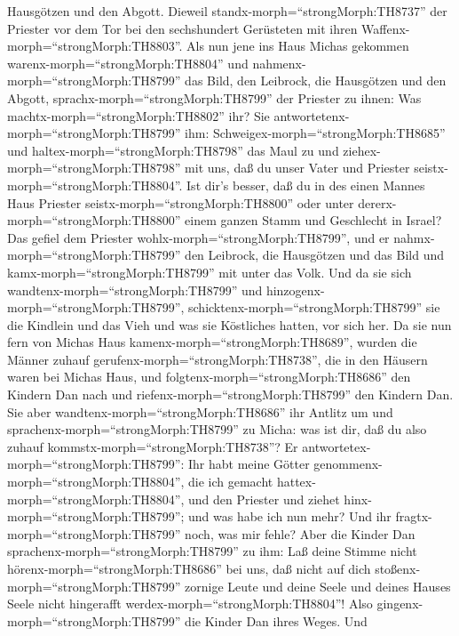 Hausgötzen und den Abgott. Dieweil standx-morph=``strongMorph:TH8737''
der Priester vor dem Tor bei den sechshundert Gerüsteten mit ihren
Waffenx-morph=``strongMorph:TH8803''.  Als nun jene ins
Haus Michas gekommen warenx-morph=``strongMorph:TH8804'' und
nahmenx-morph=``strongMorph:TH8799'' das Bild, den Leibrock, die
Hausgötzen und den Abgott, sprachx-morph=``strongMorph:TH8799'' der
Priester zu ihnen: Was machtx-morph=``strongMorph:TH8802'' ihr?
 Sie antwortetenx-morph=``strongMorph:TH8799'' ihm:
Schweigex-morph=``strongMorph:TH8685'' und
haltex-morph=``strongMorph:TH8798'' das Maul zu und
ziehex-morph=``strongMorph:TH8798'' mit uns, daß du unser Vater und
Priester seistx-morph=``strongMorph:TH8804''. Ist dir's besser, daß du
in des einen Mannes Haus Priester seistx-morph=``strongMorph:TH8800''
oder unter derer\textbar x-morph=``strongMorph:TH8800'' einem ganzen
Stamm und Geschlecht in Israel?  Das gefiel dem Priester
wohlx-morph=``strongMorph:TH8799'', und er
nahmx-morph=``strongMorph:TH8799'' den Leibrock, die Hausgötzen und das
Bild und kamx-morph=``strongMorph:TH8799'' mit unter das Volk.
 Und da sie sich wandtenx-morph=``strongMorph:TH8799'' und
hinzogenx-morph=``strongMorph:TH8799'',
schicktenx-morph=``strongMorph:TH8799'' sie die Kindlein und das Vieh
und was sie Köstliches hatten, vor sich her.  Da sie nun
fern von Michas Haus kamenx-morph=``strongMorph:TH8689'', wurden die
Männer zuhauf gerufenx-morph=``strongMorph:TH8738'', die in den Häusern
waren bei Michas Haus, und folgtenx-morph=``strongMorph:TH8686'' den
Kindern Dan nach und riefenx-morph=``strongMorph:TH8799'' den Kindern
Dan.  Sie aber wandtenx-morph=``strongMorph:TH8686'' ihr
Antlitz um und sprachenx-morph=``strongMorph:TH8799'' zu Micha: was ist
dir, daß du also zuhauf kommstx-morph=``strongMorph:TH8738''?
 Er antwortetex-morph=``strongMorph:TH8799'': Ihr habt
meine Götter genommenx-morph=``strongMorph:TH8804'', die ich gemacht
hattex-morph=``strongMorph:TH8804'', und den Priester und ziehet
hinx-morph=``strongMorph:TH8799''; und was habe ich nun mehr? Und ihr
fragtx-morph=``strongMorph:TH8799'' noch, was mir fehle? 
Aber die Kinder Dan sprachenx-morph=``strongMorph:TH8799'' zu ihm: Laß
deine Stimme nicht hörenx-morph=``strongMorph:TH8686'' bei uns, daß
nicht auf dich stoßenx-morph=``strongMorph:TH8799'' zornige Leute und
deine Seele und deines Hauses Seele nicht hingerafft
werdex-morph=``strongMorph:TH8804''!  Also
gingenx-morph=``strongMorph:TH8799'' die Kinder Dan ihres Weges. Und
